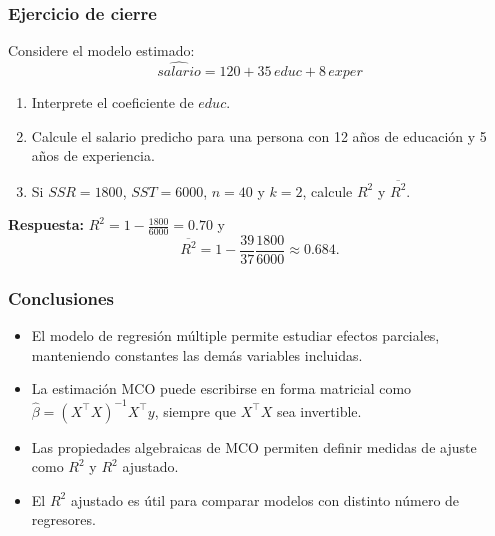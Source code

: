 \documentclass{beamer}
\begin{document}
\begin{frame}
\frametitle{Ejercicio de cierre}

Considere el modelo estimado:
\[
\widehat{salario}=120+35\,educ+8\,exper
\]

\begin{enumerate}
    \item Interprete el coeficiente de \(educ\).
    \item Calcule el salario predicho para una persona con 12 años de educación y 5 años de experiencia.
    \item Si \(SSR=1800\), \(SST=6000\), \(n=40\) y \(k=2\), calcule \(R^2\) y \(\overline{R^2}\).
\end{enumerate}

\vspace{0.2cm}
\textbf{Respuesta:} \(R^2=1-\frac{1800}{6000}=0.70\) y
\[
\overline{R^2}=1-\frac{39}{37}\frac{1800}{6000}\approx 0.684.
\]

\end{frame}

\begin{frame}
\frametitle{Conclusiones}
\begin{itemize}
    \item El modelo de regresión múltiple permite estudiar efectos parciales, manteniendo constantes las demás variables incluidas.
    \item La estimación MCO puede escribirse en forma matricial como \(\hat{\beta}=(X^\top X)^{-1}X^\top y\), siempre que \(X^\top X\) sea invertible.
    \item Las propiedades algebraicas de MCO permiten definir medidas de ajuste como \(R^2\) y \(R^2\) ajustado.
    \item El \(R^2\) ajustado es útil para comparar modelos con distinto número de regresores.
\end{itemize}
\end{frame}
\end{document}
